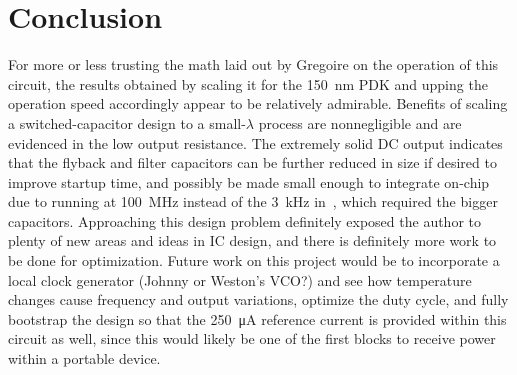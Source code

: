 \documentclass[11pt,letterpaper]{article}
\begin{document}
\section{Conclusion}

For more or less trusting the math laid out by Gregoire on the operation of this circuit, the results obtained by scaling it for the \qty{150}{\nm} PDK and upping the operation speed accordingly appear to be relatively admirable. Benefits of scaling a switched-capacitor design to a small-\(\lambda\) process are nonnegligible and are evidenced in the low output resistance. The extremely solid DC output indicates that the flyback and filter capacitors can be further reduced in size if desired to improve startup time, and possibly be made small enough to integrate on-chip due to running at \qty{100}{\mega\Hz} instead of the \qty{3}{\kHz} in~\cite{Gregiore2006}, which required the bigger capacitors. Approaching this design problem definitely exposed the author to plenty of new areas and ideas in IC design, and there is definitely more work to be done for optimization. Future work on this project would be to incorporate a local clock generator (Johnny or Weston's VCO?) and see how temperature changes cause frequency and output variations, optimize the duty cycle, and fully bootstrap the design so that the \qty{250}{\uA} reference current is provided within this circuit as well, since this would likely be one of the first blocks to receive power within a portable device.

\newpage




\newpage
\end{document}
